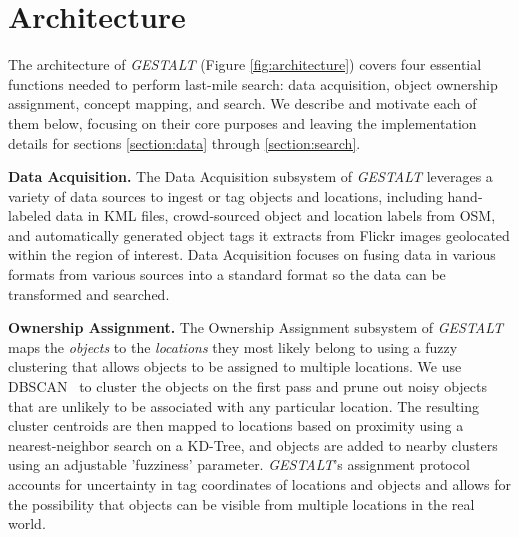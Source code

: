 \section{Architecture}
\label{section:architecture}

\begin{figure*}[t]
    
    \centering
    \caption[width=\textwidth]{The architecture of \emph{GESTALT} consists of the data collection subsystem, the ownership assignment process, the concept mapping process, and the search subsystem.}
    \label{fig:architecture}
\end{figure*}



The architecture of \textit{GESTALT} (Figure \ref{fig:architecture}) covers four essential functions needed to perform last-mile search: data acquisition, object ownership assignment, concept mapping, and search. 
We describe and motivate each of them below, focusing on their core purposes and leaving the implementation details for sections \ref{section:data} through \ref{section:search}. 

\textbf{Data Acquisition.}
The Data Acquisition subsystem of \emph{GESTALT} leverages a variety of data sources to ingest or tag objects and locations, including hand-labeled data in KML files, crowd-sourced object and location labels from OSM, and automatically generated object tags it extracts from Flickr images geolocated within the region of interest. 
Data Acquisition focuses on fusing data in various formats from various sources into a standard format so the data can be transformed and searched.

\textbf{Ownership Assignment.}
The Ownership Assignment subsystem of \emph{GESTALT} maps the \textit{objects} to the \textit{locations} they most likely belong to using a fuzzy clustering that allows objects to be assigned to multiple locations. 
We use DBSCAN~\cite{DBSCAN} to cluster the objects on the first pass and prune out noisy objects that are unlikely to be associated with any particular location.
The resulting cluster centroids are then mapped to locations based on proximity using a nearest-neighbor search on a KD-Tree, and objects are added to nearby clusters using an adjustable 'fuzziness' parameter.
\emph{GESTALT}'s assignment protocol accounts for uncertainty in tag coordinates of locations and objects and allows for the possibility that objects can be visible from multiple locations in the real world.

